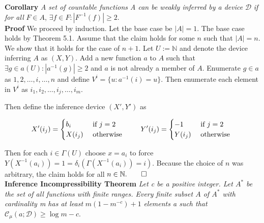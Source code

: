 \documentclass[11pt]{article}
\newcommand{\N}{\mathbb{N}}
\begin{document}
\bigskip



\textbf{Corollary} \quad \textit{A set of countable functions A can be weakly inferred by a device} $ \mathcal{D} $ \textit {if for all} $ F \in A $,  $\exists f \in F : |F^{-1}(f)| \geq 2 $. \\

\textbf{Proof} \quad We proceed by induction. Let the base case be $ |A| = 1 $. The base case holds by Theorem 5.1. Assume that the claim holds for some $ n $ such that $ |A| = n $. We show that it holds for the case of $ n + 1 $. Let $ U := \N $ and denote the device inferring $ A $ as $ (X, Y) $. Add a new function $ a $ to $ A $ such that $\exists g \in a(U) : |a^{-1}(g)| \geq 2 $ and $ a $ is not already a member of $ A $. Enumerate $ g \in a $ as $ 1, 2, \dots, i, \dots, n $ and define $ V^{i} = \{u: a^{-1}(i) = u \} $. Then enumerate each element in $ V^i $ as $ i_1, i_2, \dots, i_j, \dots, i_m $.

Then define the inference device $ ( X', Y' ) $ as 

\begin{equation*}
X'(i_j) = \begin{cases}
       b_i & \text{ if } j = 2 \\
       X(i_j) & \text{ otherwise } \\
       \end{cases} \quad \quad 
Y'(i_j) = \begin{cases}
       -1 & \text{ if } j = 2 \\
       Y(i_j) & \text{ otherwise } \\
       \end{cases} \\ 
\end{equation*}

Then for each $ i \in \Gamma(U) $ choose $ x = a_i $ to force $ Y(X^{-1}(a_i)) = 1 = \delta_{i}(\Gamma(X^{-1}(a_i)) = i) $. Because the choice of $ n $ was arbitrary, the claim holds for all $ n \in \N. \hfill \qed $ \\

\bigskip
\textbf{Inference Incompressibility Theorem} \quad \textit{Let c be a positive integer. Let $ A^{*} $ be the set of all functions with finite ranges. Every finite subset $ A $ of $ A^{*} $ with cardinality m has at least} $ m(1 - m^{-c}) + 1 $ \textit{elements a such that} $ \mathcal{C}_{\mu}(a;\mathcal{D}) \geq \log m - c $. \\
\end{document}
